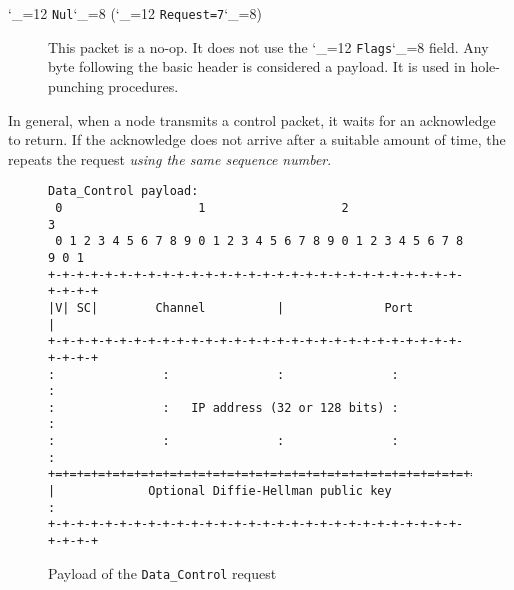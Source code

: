\documentclass{rfc}
\def\ttt{\catcode`\_=12 \tttii}
\def\tttii#1!{{\tt #1}\catcode`\_=8{}}
\begin{document}
\begin{description}
\item[\ttt Nul! (\ttt Request=7!)] This packet is a no-op. It does not
  use the \ttt Flags! field.  Any byte following the basic header is
  considered a payload. It is used in hole-punching
  procedures.   
\end{description}
%
In general, when a node transmits a control packet, it waits for an
acknowledge to return.  If the acknowledge does not arrive after a
suitable amount of time, the repeats the request \emph{using the same
  sequence number}.

\begin{figure}
  \begin{center}
    \begin{verbatim}
Data_Control payload:
 0                   1                   2                   3
 0 1 2 3 4 5 6 7 8 9 0 1 2 3 4 5 6 7 8 9 0 1 2 3 4 5 6 7 8 9 0 1
+-+-+-+-+-+-+-+-+-+-+-+-+-+-+-+-+-+-+-+-+-+-+-+-+-+-+-+-+-+-+-+-+
|V| SC|        Channel          |              Port             |
+-+-+-+-+-+-+-+-+-+-+-+-+-+-+-+-+-+-+-+-+-+-+-+-+-+-+-+-+-+-+-+-+
:               :               :               :               :
:               :   IP address (32 or 128 bits) :               :
:               :               :               :               :
+=+=+=+=+=+=+=+=+=+=+=+=+=+=+=+=+=+=+=+=+=+=+=+=+=+=+=+=+=+=+=+=+
|             Optional Diffie-Hellman public key                :
+-+-+-+-+-+-+-+-+-+-+-+-+-+-+-+-+-+-+-+-+-+-+-+-+-+-+-+-+-+-+-+-+
    \end{verbatim}
  \end{center}
\caption{Payload of the \texttt{Data\_Control} request
  \label{fig:send_payload}} 
\end{figure}
\end{document}
